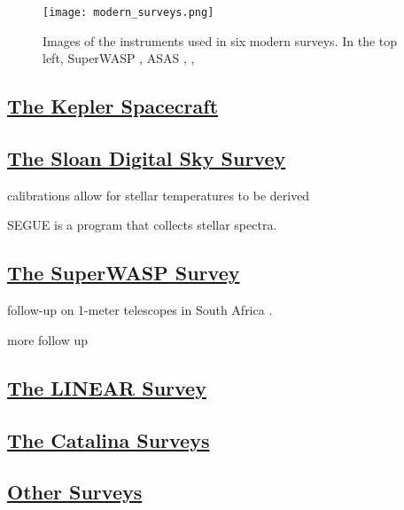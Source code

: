 \documentclass[12pt]{article} %
\numberwithin{equation}{section} %
\begin{document}
\begin{figure}[H]
\centering
\texttt{[image: modern\_surveys.png]}
\caption{Images of the instruments used in six modern surveys. In the top left, SuperWASP \citep[SuperWASP,][]{norton2011short}, ASAS \citep[ASAS,][]{pojmanski2000all}, \citep[ROTSE,][]{akerlof2000rotse},  }
\label{fig: modern_surveys}
\end{figure}


\subsection[The Kepler Spacecraft]{\hyperlink{toc}{The Kepler Spacecraft}}

\subsection[The Sloan Digital Sky Survey]{\hyperlink{toc}{The Sloan Digital Sky Survey}}

\cite{york2000sloan}

\citep{ivezic2007sloan} 

calibrations allow for stellar temperatures to be derived \cite{fukugita2011characterization}

SEGUE is a program that collects stellar spectra.

\subsection[The SuperWASP Survey]{\hyperlink{toc}{The SuperWASP Survey}}

follow-up on 1-meter telescopes in South Africa \citep{koen2016multi}.

more follow up \citep{darwish2016orbital}

\subsection[The LINEAR Survey]{\hyperlink{toc}{The LINEAR Survey}}

\subsection[The Catalina Surveys]{\hyperlink{toc}{The Catalina Surveys}}

\subsection[Other Surveys]{\hyperlink{toc}{Other Surveys}}
\end{document}
